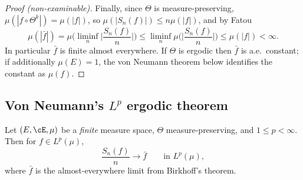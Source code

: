 \begin{proof}[Proof (non-examinable)]
	Finally, since $\Theta$ is measure-preserving, $\mu(|f\circ\Theta^k|)=\mu(|f|)$, so $\mu(|S_n(f)|)\leq n\mu(|f|)$, and by Fatou
	$$
	\mu(|\bar f|)=\mu\Big(\liminf_n\Big|\frac{S_n(f)}{n}\Big|\Big)\leq\liminf_n\mu\Big(\Big|\frac{S_n(f)}{n}\Big|\Big)\leq\mu(|f|)<\infty.
	$$
	In particular $\bar f$ is finite almost everywhere. If $\Theta$ is ergodic then $\bar f$ is a.e.\ constant; if additionally $\mu(E)=1$, the von Neumann theorem below identifies the constant as $\mu(f)$.
\end{proof}

\subsection{Von Neumann's \texorpdfstring{$L^p$}{Lp} ergodic theorem}

\begin{theorem}\label{thm:vonneumann}
	Let $(E,\cE,\mu)$ be a \emph{finite} measure space, $\Theta$ measure-preserving, and $1 \leq p<\infty$. Then for $f \in L^p(\mu)$,
	$$
	\frac{S_n(f)}{n}\longrightarrow\bar f \qquad \text{in } L^p(\mu),
	$$
	where $\bar f$ is the almost-everywhere limit from Birkhoff's theorem.
\end{theorem}
